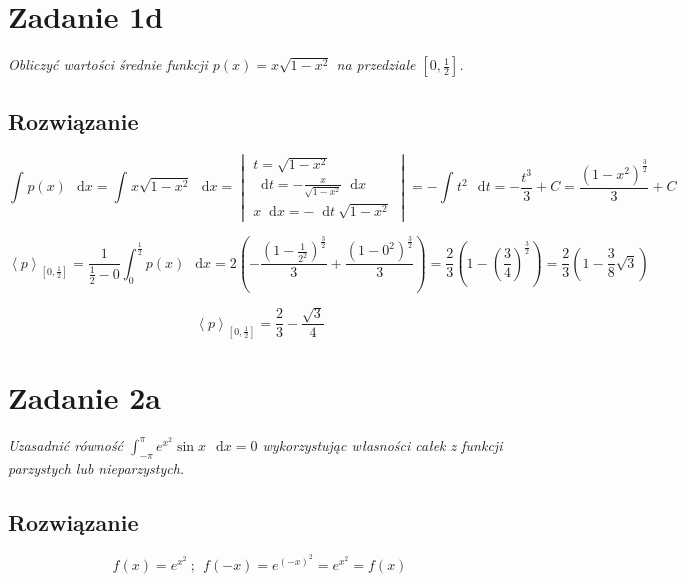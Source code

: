 \documentclass[12pt]{article}
\newcommand*\diff{\mathop{}\!\mathrm{d}}
\newcommand{\Integral}[4]{\int_{#1}^{#2} \! #3 \, \mathop{}\!\mathrm{d}#4}
\DeclareMathOperator{\?}{?}
\begin{document}
\section{Zadanie 1d}
\textit{Obliczyć wartości średnie funkcji $p(x) = x\sqrt{1-x^2}$ na przedziale $\left[0, \frac{1}{2} \right]$.}

\subsection*{Rozwiązanie}

\begin{equation*}
    \Integral{}{}{p(x)}{x} = \Integral{}{}{x\sqrt{1-x^2}}{x} =
    \begin{vmatrix}
        \displaystyle t = \sqrt{1-x^2} \\[6pt]
        \displaystyle \diff t = -\frac{x}{\sqrt{1-x^2}}\diff x \\[16pt]
        \displaystyle x \diff x = -\diff t \ \sqrt{1-x^2}
    \end{vmatrix}
    =
    -\Integral{}{}{t^2}{t} =
    -\frac{t^3}{3} + C = \frac{(1-x^2)^{\frac{3}{2}}}{3} + C
\end{equation*}

\begin{equation*}
    \left< p \right>_{[0,\frac{1}{2}]} =
    \frac{1}{\frac{1}{2} - 0} \Integral{0}{\frac{1}{2}}{p(x)}{x} =
    2\left( -\frac{(1- \frac{1}{2^2})^{\frac{3}{2}}}{3} + \frac{(1-0^2)^{\frac{3}{2}}}{3} \right) =
    \frac{2}{3} \left(1 - \left(\frac{3}{4}\right)^{\frac{3}{2}} \right) =
    \frac{2}{3} \left(1 - \frac{3}{8}\sqrt{3} \right)
\end{equation*}

\begin{equation*}
    \left< p \right>_{[0,\frac{1}{2}]} =
    \frac{2}{3} - \frac{\sqrt{3}}{4}
\end{equation*}

\section{Zadanie 2a}
\textit{Uzasadnić równość $ \displaystyle \Integral{-\pi}{\pi}{e^{x^2} \sin{x}}{x} = 0 $
wykorzystując własności całek z funkcji parzystych lub nieparzystych.}

\subsection*{Rozwiązanie}
\begin{equation*}
    f(x) = e^{x^2}\ ;\ \ f(-x) = e^{(-x)^2} = e^{x^2} = f(x)
\end{equation*}
\end{document}
